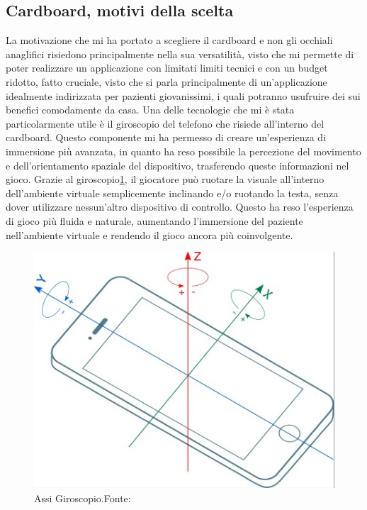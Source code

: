 \documentclass[
a4paper,
cleardoublepage=empty,
headings=twolinechapter,
numbers=autoenddot,
]{scrbook}
\begin{document}
  \subsection{Cardboard, motivi della scelta}\label{chap:cardboard_motivi}
    La motivazione che mi ha portato a scegliere il cardboard e non gli occhiali anaglifici risiedono principalmente nella sua versatilità, visto che mi permette di poter realizzare un applicazione con limitati limiti tecnici e con un budget ridotto, fatto cruciale, visto che si parla principalmente di un'applicazione idealmente indirizzata per pazienti giovanissimi, i quali potranno usufruire dei sui benefici comodamente da casa.
    Una delle tecnologie che mi è stata particolarmente utile è il giroscopio del telefono che risiede all'interno del cardboard. Questo componente mi ha permesso di creare un'esperienza di immersione più avanzata, in quanto ha reso possibile la percezione del movimento e dell'orientamento spaziale del dispositivo, trasferendo queste informazioni nel gioco. Grazie al giroscopio\ref{fig:giroscopio}, il giocatore può ruotare la visuale all'interno dell'ambiente virtuale semplicemente inclinando e/o ruotando la testa, senza dover utilizzare nessun'altro dispositivo di controllo. Questo ha reso l'esperienza di gioco più fluida e naturale, aumentando l'immersione del paziente nell'ambiente virtuale e rendendo il gioco ancora più coinvolgente.
     \begin{figure}[H]
    	\centering
    	\includegraphics[width=0.5\linewidth]{image/giroscopio}
    	\caption{Assi Giroscopio.Fonte:\cite{Giro_image}}
    	\label{fig:giroscopio}
    \end{figure}
\end{document}
